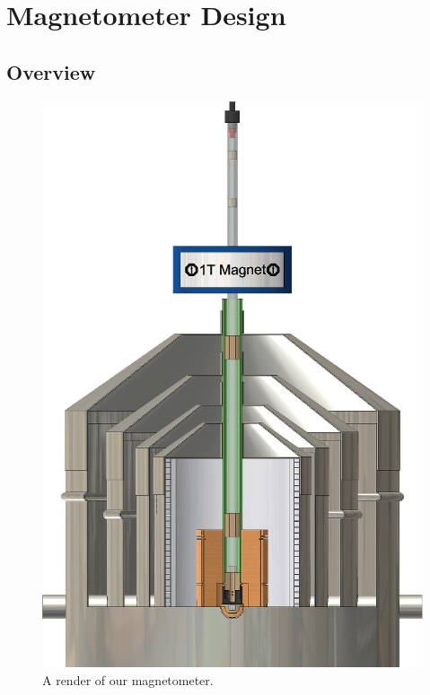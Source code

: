 \documentclass[PaulGanssle-Thesis.tex]{subfiles}
\begin{document}
\chapter{Magnetometer Design}
\label{magnetometer.design}
\section{Overview}
\label{magnetometer.design.overview}
\begin{figure}
\vspace*{-0.8\lineheight}
\includegraphics[width=0.45\tw]{figures/magnetometer/MagnetometerCutaway.png}
\caption{A render of our magnetometer.}
\label{fig:MagnetometerCutaway}
\vspace*{-0.8\lineheight}
\end{figure}
\end{document}
